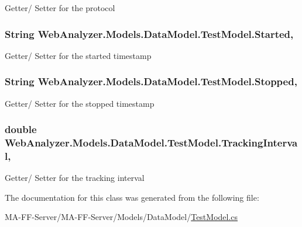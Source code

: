 Getter/ Setter for the protocol 

\hypertarget{class_web_analyzer_1_1_models_1_1_data_model_1_1_test_model_acdb09845b9c3bc8582f78d2729524216}{}
\subsubsection[{Started}]{\setlength{\rightskip}{0pt plus 5cm}String Web\+Analyzer.\+Models.\+Data\+Model.\+Test\+Model.\+Started\hspace{0.3cm}{\ttfamily [get]}, {\ttfamily [set]}}\label{class_web_analyzer_1_1_models_1_1_data_model_1_1_test_model_acdb09845b9c3bc8582f78d2729524216}


Getter/ Setter for the started timestamp 

\hypertarget{class_web_analyzer_1_1_models_1_1_data_model_1_1_test_model_a636a8cedde376c835de9d909e8ec2c2d}{}
\subsubsection[{Stopped}]{\setlength{\rightskip}{0pt plus 5cm}String Web\+Analyzer.\+Models.\+Data\+Model.\+Test\+Model.\+Stopped\hspace{0.3cm}{\ttfamily [get]}, {\ttfamily [set]}}\label{class_web_analyzer_1_1_models_1_1_data_model_1_1_test_model_a636a8cedde376c835de9d909e8ec2c2d}


Getter/ Setter for the stopped timestamp 

\hypertarget{class_web_analyzer_1_1_models_1_1_data_model_1_1_test_model_a8f50461cf57a8d7c48b795b28335fbd3}{}
\subsubsection[{Tracking\+Interval}]{\setlength{\rightskip}{0pt plus 5cm}double Web\+Analyzer.\+Models.\+Data\+Model.\+Test\+Model.\+Tracking\+Interval\hspace{0.3cm}{\ttfamily [get]}, {\ttfamily [set]}}\label{class_web_analyzer_1_1_models_1_1_data_model_1_1_test_model_a8f50461cf57a8d7c48b795b28335fbd3}


Getter/ Setter for the tracking interval 



The documentation for this class was generated from the following file\+:\begin{DoxyCompactItemize}
\item 
M\+A-\/\+F\+F-\/\+Server/\+M\+A-\/\+F\+F-\/\+Server/\+Models/\+Data\+Model/\hyperlink{_test_model_8cs}{Test\+Model.\+cs}\end{DoxyCompactItemize}
